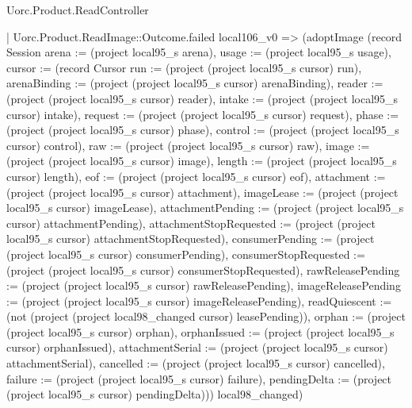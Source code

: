 \begin{lexlean}{Uorc.Product.ReadController}
\begin{semanticmodule}
{      | Uorc.Product.ReadImage::Outcome.failed local106_v0 => (adoptImage (record Session {arena := (project local95_s arena), usage := (project local95_s usage), cursor := (record Cursor {run := (project (project local95_s cursor) run), arenaBinding := (project (project local95_s cursor) arenaBinding), reader := (project (project local95_s cursor) reader), intake := (project (project local95_s cursor) intake), request := (project (project local95_s cursor) request), phase := (project (project local95_s cursor) phase), control := (project (project local95_s cursor) control), raw := (project (project local95_s cursor) raw), image := (project (project local95_s cursor) image), length := (project (project local95_s cursor) length), eof := (project (project local95_s cursor) eof), attachment := (project (project local95_s cursor) attachment), imageLease := (project (project local95_s cursor) imageLease), attachmentPending := (project (project local95_s cursor) attachmentPending), attachmentStopRequested := (project (project local95_s cursor) attachmentStopRequested), consumerPending := (project (project local95_s cursor) consumerPending), consumerStopRequested := (project (project local95_s cursor) consumerStopRequested), rawReleasePending := (project (project local95_s cursor) rawReleasePending), imageReleasePending := (project (project local95_s cursor) imageReleasePending), readQuiescent := (not (project (project local98_changed cursor) leasePending)), orphan := (project (project local95_s cursor) orphan), orphanIssued := (project (project local95_s cursor) orphanIssued), attachmentSerial := (project (project local95_s cursor) attachmentSerial), cancelled := (project (project local95_s cursor) cancelled), failure := (project (project local95_s cursor) failure), pendingDelta := (project (project local95_s cursor) pendingDelta)})}) local98_changed)
}
\end{semanticmodule}
\end{lexlean}
